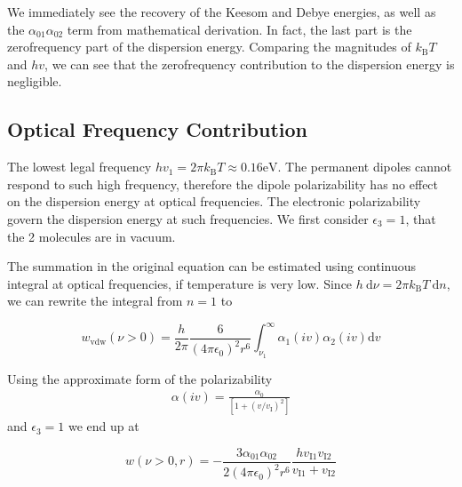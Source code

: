 \documentclass[letterpaper,10pt,english]{sphinxmanual}
\begin{document}
\sphinxAtStartPar
We immediately see the recovery of the Keesom and Debye energies, as well as the \(\alpha_{01} \alpha_{02}\) term from mathematical derivation. In fact, the last part is the zero\sphinxhyphen{}frequency part of the dispersion energy. Comparing the magnitudes of \(k_{\mathrm{B}} T\) and \(h v\), we can see that the zero\sphinxhyphen{}frequency contribution to the dispersion energy is negligible.


\subsection{Optical Frequency Contribution}
\label{\detokenize{notebooks/L10/1_van_der_Waals:Optical-Frequency-Contribution}}
\sphinxAtStartPar
The lowest legal frequency \(h v_{1}=2 \pi k_{\mathrm{B}} T \approx 0.16 \mathrm{eV}\). The permanent dipoles cannot respond to such high frequency, therefore the dipole polarizability has no effect on the dispersion energy at optical frequencies. The electronic polarizability govern the dispersion energy at such frequencies. We first consider \(\epsilon_{3}=1\), that the 2 molecules are in vacuum.

\sphinxAtStartPar
The summation in the original equation can be estimated using continuous integral at optical frequencies, if temperature is very low. Since \(h \mathrm{~d} \nu=2 \pi k_{\mathrm{B}} T \mathrm{~d} n\), we can rewrite the integral from \(n=1\) to

\sphinxAtStartPar
\begin{equation}
w_{\mathrm{vdw}}(\nu>0)=\frac{h}{2 \pi} \frac{6}{\left(4 \pi \epsilon_{0}\right)^{2} r^{6}} \int_{\nu_{1}}^{\infty} \alpha_{1}(i v) \alpha_{2}(i v) \mathrm{d} v
\end{equation}

\sphinxAtStartPar
Using the approximate form of the polarizability
\begin{equation*}
\begin{split}\alpha(i v)=\frac{\alpha_{0}}{\left[1+\left(v / v_{\mathrm{I}}\right)^{2}\right]}\end{split}
\end{equation*}
\sphinxAtStartPar
and \(\epsilon_3=1\) we end up at

\sphinxAtStartPar
\begin{equation}
w(\nu>0, r)=-\frac{3 \alpha_{01} \alpha_{02}}{2\left(4 \pi \epsilon_{0}\right)^{2} r^{6}} \frac{h v_{\mathrm{I} 1} v_{\mathrm{I} 2}}{v_{\mathrm{I} 1}+v_{\mathrm{I} 2}}
\end{equation}
\end{document}
